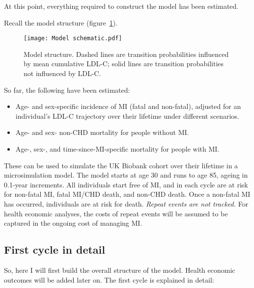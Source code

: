 \documentclass[11pt]{article}
\begin{document}
At this point, everything required to construct the model has been estimated.

Recall the model structure (figure~\ref{Schematic1}).

\begin{figure}
    \centering
    \texttt{[image: Model schematic.pdf]}
    \caption{Model structure. Dashed lines are transition probabilities influenced by mean cumulative LDL-C; solid lines are transition probabilities not influenced by LDL-C.}
    \label{Schematic1}
\end{figure}

So far, the following have been estimated:
\begin{itemize}
\item Age- and sex-specific incidence of MI (fatal and non-fatal), 
adjusted for an individual's LDL-C trajectory over their lifetime
under different scenarios.
\item Age- and sex- non-CHD mortality for people without MI. 
\item Age-, sex-, and time-since-MI-specific mortality for people with MI. 
\end{itemize}

These can be used to simulate the UK Biobank cohort 
over their lifetime in a microsimulation model. 
The model starts at age 30 and runs to age 85, ageing in 0.1-year increments. 
All individuals start free of MI, and in each cycle are at risk for non-fatal MI, 
fatal MI/CHD death, and non-CHD death. Once a non-fatal MI has occurred, individuals are at risk for death. 
\emph{Repeat events are not tracked.}
For health economic analyses, the costs of repeat events will be assumed to be 
captured in the ongoing cost of managing MI. 

\subsection{First cycle in detail}

So, here I will first build the overall structure of the model.
Health economic outcomes will be added later on. 
The first cycle is explained in detail:

\color{Blue4}
\begin{stlog}\end{stlog}
\begin{stlog}\end{stlog}
\begin{stlog}\end{stlog}
\color{black}
\end{document}
